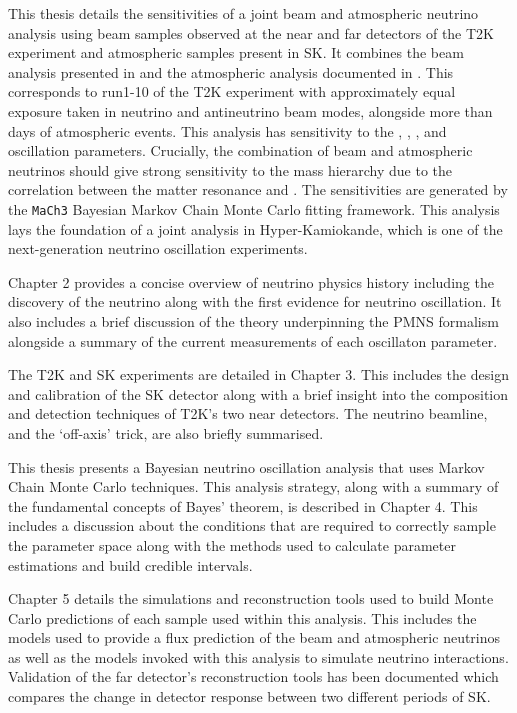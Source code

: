 This thesis details the sensitivities of a joint beam and atmospheric neutrino analysis using beam samples observed at the near and far detectors of the T2K experiment and atmospheric samples present in SK. It combines the beam analysis presented in \cite{Dunne2020-uf} and the atmospheric analysis documented in \cite{Jiang2019-iw}. This corresponds to run1-10 of the T2K experiment with approximately equal exposure taken in neutrino and antineutrino beam modes, alongside more than  days of atmospheric events. This analysis has sensitivity to the , , , and  oscillation parameters. Crucially, the combination of beam and atmospheric neutrinos should give strong sensitivity to the mass hierarchy due to the correlation between the matter resonance and . The sensitivities are generated by the \texttt{MaCh3} Bayesian Markov Chain Monte Carlo fitting framework. This analysis lays the foundation of a joint analysis in Hyper-Kamiokande, which is one of the next-generation neutrino oscillation experiments.

Chapter 2 provides a concise overview of neutrino physics history including the discovery of the neutrino along with the first evidence for neutrino oscillation. It also includes a brief discussion of the theory underpinning the PMNS formalism alongside a summary of the current measurements of each oscillaton parameter.

The T2K and SK experiments are detailed in Chapter 3. This includes the design and calibration of the SK detector along with a brief insight into the composition and detection techniques of T2K's two near detectors. The neutrino beamline, and the `off-axis' trick, are also briefly summarised. 

This thesis presents a Bayesian neutrino oscillation analysis that uses Markov Chain Monte Carlo techniques. This analysis strategy, along with a summary of the fundamental concepts of Bayes' theorem, is described in Chapter 4. This includes a discussion about the conditions that are required to correctly sample the parameter space along with the methods used to calculate parameter estimations and build credible intervals.

Chapter 5 details the simulations and reconstruction tools used to build Monte Carlo predictions of each sample used within this analysis. This includes the models used to provide a flux prediction of the beam and atmospheric neutrinos as well as the models invoked with this analysis to simulate neutrino interactions. Validation of the far detector's reconstruction tools has been documented which compares the change in detector response between two different periods of SK.

